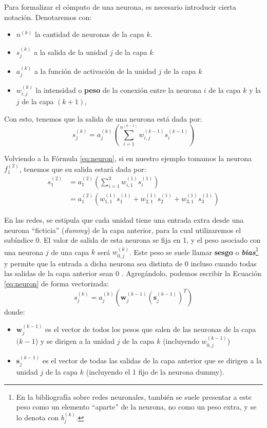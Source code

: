 \documentclass[../../main.tex]{subfiles}
\begin{document}
Para formalizar el cómputo de una neurona, es necesario introducir cierta notación.
Denotaremos con:
\begin{itemize}[itemsep=0.1cm]
    \item \(n^{(k)}\) la cantidad de neuronas de la capa \(k\).
    \item \(s^{(k)}_j\) a la salida de la unidad \(j\) de la capa \(k\)
    \item \(a^{(k)}_j\) a la función de activación de la unidad \(j\) de la capa \(k\)
    \item \(w^{(k)}_{i,j}\) la intensidad o \textbf{peso} de la conexión entre la
    neurona \(i\) de la capa \(k\) y la \(j\) de la capa \((k+1)\),
\end{itemize}
Con esto, tenemos que la salida de una neurona está dada por:
\begin{equation}
    s^{(k)}_j = a^{(k)}_j \left( \sum_{i=1}^{n^{(k-1)}} w^{(k-1)}_{i,j} s^{(k-1)}_i \right)
    \label{eq:neuron}
\end{equation}

Volviendo a la Fórmula \ref{eq:neuron}, si en nuestro ejemplo tomamos la neurona
\(f^{(2)}_1\), tenemos que su salida estará dada por:
\begin{align*}
    s^{(2)}_1 &= a^{(2)}_1 \left( \sum_{i=1}^{3} w^{(1)}_{i,1} s^{(1)}_i \right) \\
              &= a^{(2)}_1 \left( w^{(1)}_{1,1}s^{(1)}_1 +  w^{(1)}_{2,1}s^{(1)}_2 + w^{(1)}_{3,1}s^{(1)}_3 \right)
\end{align*}

En las redes, se estipula que cada unidad tiene una entrada extra desde una neurona
``ficticia'' (\textit{dummy}) de la capa anterior, para la cual utilizaremos el subíndice
0. El valor de salida de esta neurona se fija en 1, y el peso asociado con una neurona
\(j\) de una capa \(k\) será \(w^{(k)}_{0,j}\). Este peso se suele llamar \textbf{sesgo} o
\textit{\textbf{bias}}\footnote{En la bibliografía sobre redes neuronales, también se
suele presentar a este peso como un elemento ``aparte'' de la neurona, no como un peso
extra, y se lo denota con \(b^{(k)}_j\).} y permite que la entrada a dicha neurona sea
distinta de 0 incluso cuando todas las salidas de la capa anterior sean 0
\cite{ai-a-modern-approach}. Agregándolo, podemos escribir la Ecuación \ref{eq:neuron} de
forma vectorizada:
\begin{equation}
    s^{(k)}_j = a^{(k)}_j \left( \bm{w}^{(k-1)}_j \left( \bm{s}^{(k-1)}_j \right)^T \right)
\end{equation}
donde: \vspace{-0.25cm}
\begin{itemize}
    \item \(\bm{w}^{(k-1)}_j\) es el vector de todos los pesos que salen de las neuronas de la
    capa \((k-1\)) y se dirigen a la unidad \(j\) de la capa \(k\) (incluyendo \(w^{(k-1)}_{0,j}\))
    \item \(\bm{s}^{(k-1)}_j\) es el vector de todas las salidas de la capa anterior que se
dirigen a la unidad \(j\) de la capa \(k\) (incluyendo el 1 fijo de la neurona dummy).
\end{itemize}
\end{document}
